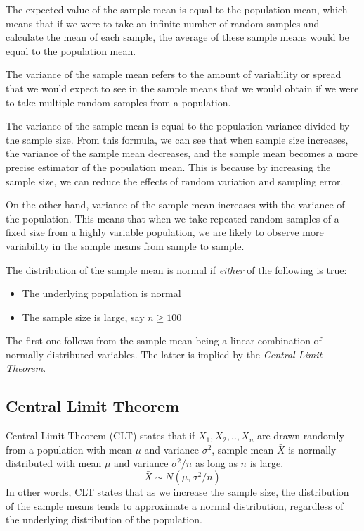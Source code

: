 \documentclass{./../../Latex/handout}
\begin{document}
The expected value of the sample mean is equal to the population mean, which means that if we were to take an infinite number of random samples and calculate the mean of each sample, the average of these sample means would be equal to the population mean.

The variance of the sample mean refers to the amount of variability or spread that we would expect to see in the sample means that we would obtain if we were to take multiple random samples from a population. 

The variance of the sample mean is equal to the population variance divided by the sample size. From this formula, we can see that when sample size increases, the variance of the sample mean decreases, and the sample mean becomes a more precise estimator of the population mean. This is because by increasing the sample size, we can reduce the effects of random variation and sampling error. 

On the other hand, variance of the sample mean increases with the variance of the population. This means that when we take repeated random samples of a fixed size from a highly variable population, we are likely to observe more variability in the sample means from sample to sample.

The distribution of the sample mean is \underline{normal} if \textit{either} of the following is true: 
\begin{itemize}
  \item The underlying population is normal \vspace{-1em}
  \item The sample size is large, say $n\geq 100$ 
\end{itemize}
The first one follows from the sample mean being a linear combination of normally distributed variables. The latter is implied by the \textit{Central Limit Theorem}. 

\subsection*{Central Limit Theorem}

Central Limit Theorem (CLT) states that if $X_1, X_2,..,X_n$ are drawn randomly from a population with mean $\mu$ and variance $\sigma^2$, sample mean $\bar{X}$ is normally distributed with mean $\mu$ and variance $\sigma^2/n$ as long as $n$ is large.
$$\bar{X} \sim N(\mu, \sigma^2/n)$$
 In other words, CLT states that as we increase the sample size, the distribution of the sample means tends to approximate a normal distribution, regardless of the underlying distribution of the population.
\end{document}
